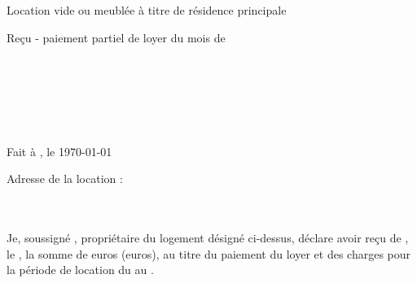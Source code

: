 \documentclass[12pt,a4paper]{article}
\begin{document}
\thispagestyle{empty}

\begin{center}
Location vide ou meublée à titre de résidence principale\\
\begin{LARGE}
Reçu - paiement partiel de loyer du mois de \nommois\space\annee
\end{LARGE}
\end{center}
\bigskip

\begin{flushleft}
\nomproprio\\
\adresseproprio\\
\villeproprio
\end{flushleft}

\medskip

\begin{flushright}
\nomlocataire\\
\adresselocataire\\
\villelocataire
\end{flushright}

\medskip

\begin{flushright}
Fait à \lieudocument, le \today
\end{flushright}

\medskip

\begin{flushleft}
Adresse de la location :\\
\adresselocation\\
\lotlocation\\
\villelocation
\end{flushleft}

\medskip

\begin{flushleft}
\-\hspace{0.5cm}Je, soussigné \nomproprio, propriétaire du logement désigné ci-dessus, déclare avoir reçu de \nomlocataire, le \datepaiement, la somme de \montantrecuchiffres\space euros (\montantreculettres\space euros), au titre du paiement du loyer et des charges pour la période de location du \debutmois\space au \finmois\space.
\end{flushleft}

\medskip
\end{document}

